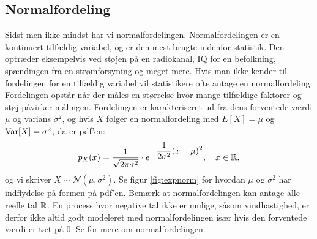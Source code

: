\subsection{Normalfordeling}
Sidst men ikke mindst har vi normalfordelingen. Normalfordelingen er en kontinuert tilfældig variabel, og er den mest brugte indenfor statistik. Den optræder eksempelvis ved støjen på en radiokanal, IQ for en befolkning, spændingen fra en strømforsyning og meget mere. Hvis man ikke kender til fordelingen for en tilfældig variabel vil statistikere ofte antage en normalfordeling.   Fordelingen opstår når der måles en størrelse hvor mange tilfældige faktorer og støj påvirker målingen. Fordelingen er karakteriseret ud fra dens forventede værdi $\mu$ og varians $\sigma^2$, og hvis $X$ følger en normalfordeling med $E[X] = \mu$ og $\operatorname{Var}[X] = \sigma^2$, da er pdf'en:
\begin{align*}
p_X(x) = \frac{1}{\sqrt{2\pi\sigma^2}}\cdot e^{\displaystyle-\frac{1}{2\sigma^2}(x-\mu)^2}, \quad  x \in \mathbb{R},
\end{align*}
og vi skriver $X \sim \mathcal{N}(\mu,\sigma^2)$. Se figur \ref{fig:expnorm} for hvordan $\mu$ og $\sigma^2$ har indflydelse på formen på pdf'en. Bemærk at normalfordelingen kan antage alle reelle tal $\mathbb{R}$. En process hvor negative tal ikke er mulige, såsom vindhastighed, er derfor ikke altid godt modeleret med normalfordelingen især hvis den forventede værdi er tæt på $0$. Se \cite[127-131]{olofsson2012} for mere om normalfordelingen. 